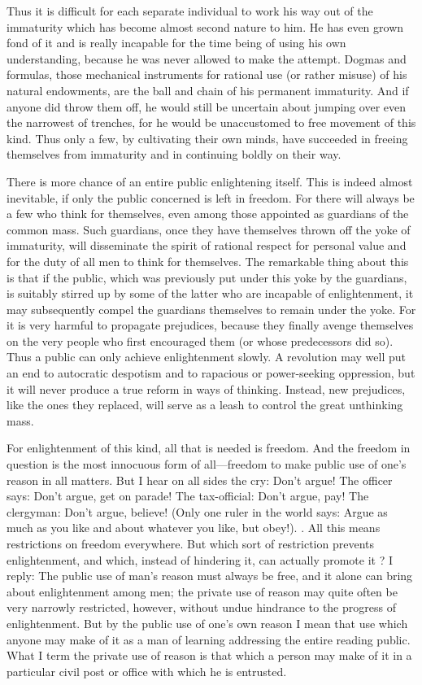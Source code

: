 \documentclass[11pt,twocolumn]{ltugboat}
\begin{document}
Thus it is difficult for each separate individual to work his way out of the immaturity which has become almost second nature to him. He has even grown fond of it and is really incapable for the time being of using his own understanding, because he was never allowed to make the attempt. Dogmas and formulas, those mechanical instruments for rational use (or rather misuse) of his natural endowments, are the ball and chain of his permanent immaturity. And if anyone did throw them off, he would still be uncertain about jumping over even the narrowest of trenches, for he would be unaccustomed to free movement of this kind. Thus only a few, by cultivating their own minds, have succeeded in freeing themselves from immaturity and in continuing boldly on their way.

There is more chance of an entire public enlightening itself. This is indeed almost inevitable, if only the public concerned is left in freedom. For there will always be a few who think for themselves, even among those appointed as guardians of the common mass. Such guardians, once they have themselves thrown off the yoke of immaturity, will disseminate the spirit of rational respect for personal value and for the duty of all men to think for themselves. The remarkable thing about this is that if the public, which was previously put under this yoke by the guardians, is suitably stirred up by some of the latter who are incapable of enlightenment, it may subsequently compel the guardians themselves to remain under the yoke. For it is very harmful to propagate prejudices, because they finally avenge themselves on the very people who first encouraged them (or whose predecessors did so). Thus a public can only achieve enlightenment slowly. A revolution may well put an end to autocratic despotism and to rapacious or power-seeking oppression, but it will never produce a true reform in ways of thinking. Instead, new prejudices, like the ones they replaced, will serve as a leash to control the great unthinking mass.

For enlightenment of this kind, all that is needed is freedom. And the freedom in question is the most innocuous form of all—freedom to make public use of one's reason in all matters. But I hear on all sides the cry: Don't argue! The officer says: Don't argue, get on parade! The tax-official: Don't argue, pay! The clergyman: Don't argue, believe! (Only one ruler in the world says: Argue as much as you like and about whatever you like, but obey!). . All this means restrictions on freedom everywhere. But which sort of restriction prevents enlightenment, and which, instead of hindering it, can actually promote it ? I reply: The public use of man's reason must always be free, and it alone can bring about enlightenment among men; the private use of reason may quite often be very narrowly restricted, however, without undue hindrance to the progress of enlightenment. But by the public use of one's own reason I mean that use which anyone may make of it as a man of learning addressing the entire reading public. What I term the private use of reason is that which a person may make of it in a particular civil post or office with which he is entrusted.
\end{document}
